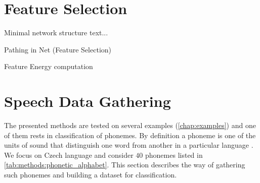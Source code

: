 \section{Feature Selection} \label{sec:feature_selection}
Minimal network structure text...

Pathing in Net (Feature Selection)

Feature Energy computation

\newpage
\section{Speech Data Gathering} \label{sec:speech_data_gathering}
The presented methods are tested on several examples (\cref{chap:examples}) and one of them rests in classification of phonemes. By definition a phoneme is one of the units of sound that distinguish one word from another in a particular language \citep{wiki:mnist}. We focus on Czech language and consider $ 40 $ phonemes listed in \cref{tab:methods:phonetic_alphabet}. This section describes the way of gathering such phonemes and building a dataset for classification.

